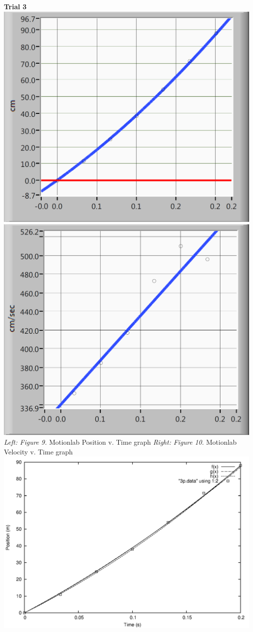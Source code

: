 \documentclass[12pt,letterpaper]{article}
\begin{document}
\textbf{Trial 3}
\newline\newline
\includegraphics[scale=0.47]{r3p.png}
\includegraphics[scale=0.47]{r3v.png}
\textit{Left: Figure 9.} Motionlab Position v. Time graph \textit{Right: Figure 10.} Motionlab Velocity v. Time graph
\newline
\includegraphics[scale=0.6]{3p.png}
\end{document}
